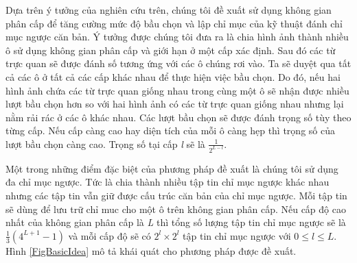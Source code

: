 Dựa trên ý tưởng của nghiên cứu trên, chúng tôi đề xuất sử dụng không gian phân cấp để tăng cường mức độ bầu chọn và lập chỉ mục của kỹ thuật đánh chỉ mục ngược căn bản. Ý tưởng được chúng tôi đưa ra là chia hình ảnh thành nhiều ô sử dụng không gian phân cấp và giới hạn ở một cấp xác định. Sau đó các từ trực quan sẽ được đánh số tương ứng với các ô chúng rơi vào. Ta sẽ duyệt qua tất cả các ô ở tất cả các cấp khác nhau để thực hiện việc bầu chọn. Do đó, nếu hai hình ảnh chứa các từ trực quan giống nhau trong cùng một ô sẽ nhận được nhiều lượt bầu chọn hơn so với hai hình ảnh có các từ trực quan giống nhau nhưng lại nằm rải rác ở các ô khác nhau. Các lượt bầu chọn sẽ được đánh trọng số tùy theo từng cấp. Nếu cấp càng cao hay diện tích của mỗi ô càng hẹp thì trọng số của lượt bầu chọn càng cao. Trọng số tại cấp \textit{l} sẽ là $\frac{1}{2^{L-l}}$.

Một trong những điểm đặc biệt của phương pháp đề xuất là chúng tôi sử dụng đa chỉ mục ngược. Tức là chia thành nhiều tập tin chỉ mục ngược khác nhau nhưng các tập tin vẫn giữ được cấu trúc căn bản của chỉ mục ngược. Mỗi tập tin sẽ dùng để lưu trữ chỉ muc cho một ô trên không gian phân cấp. Nếu cấp độ cao nhất của không gian phân cấp là \textit{L} thì tổng số lượng tập tin chỉ mục ngược sẽ là $\frac{1}{3}(4^{L+1} - 1)$ và mỗi cấp độ sẽ có $2^l \times 2^l$ tập tin chỉ mục ngược với $0 \leq l \leq L$. Hình \ref{FigBasicIdea} mô tả khái quát cho phương pháp được đề xuất.

